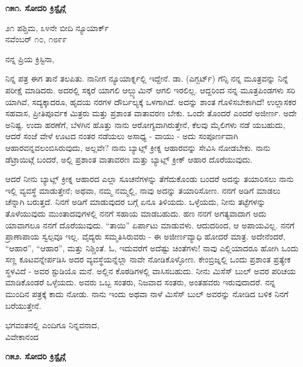 \begin{center}
\textbf{೧೫೧. ಸೋದರಿ ಕ್ರಿಸ್ಟೈನ್ಗೆ}
\end{center}

\begin{flushright}
೨೧ ಪಶ್ಚಿಮ, ೩೪ನೇ ಬೀದಿ ನ್ಯೂಯಾರ್ಕ್\\ನವೆಂಬರ್ ೧೦, ೧೮೯೯
\end{flushright}

ನನ್ನ ಪ್ರಿಯ ಕ್ರಿಸ್ಟಿನಾ,

ನಿನ್ನ ಪತ್ರ ಈಗ ತಾನೆ ತಲಪಿತು. ನಾನೀಗ ನ್ಯೂಯಾರ್ಕ್ನಲ್ಲಿ ಇದ್ದೇನೆ. ಡಾ. (ಎಗ್ಬರ್ಟ್) ಗೆನ್ಸಿ ನನ್ನ ಮೂತ್ರವನ್ನು ನಿನ್ನೆ ಪರೀಕ್ಷೆ ಮಾಡಿದರು. ಅದರಲ್ಲಿ ಸಕ್ಕರೆ ಯಾಗಲಿ ಆಲ್ಬ್ಯುಮಿನ್ ಆಗಲಿ ಇರಲಿಲ್ಲ. ಆದ್ದರಿಂದ ನನ್ನ ಮೂತ್ರಪಿಂಡಗಳು ಸರಿ ಯಾಗಿವೆ, ಸದ್ಯಕ್ಕಾದರೂ, ಹೃದಯ ನರಗಳ ದೌರ್ಬಲ್ಯಕ್ಕೆ ಒಳಗಾಗಿದೆ. ಅದನ್ನು ಶಾಂತ ಗೊಳಿಸಬೇಕಾಗಿದೆ! ಉಲ್ಲಾಸಕರ ಸಹವಾಸ, ಪ್ರೀತಿಪೂರ್ವಕ ಮಿತ್ರರು ಮತ್ತು ಪ್ರಶಾಂತ ವಾತಾವರಣ ಬೇಕು. ಒಂದೇ ತೊಂದರೆ ಎಂದರೆ ಅಜೀರ್ಣ. ಅದೇ ಅನಿಷ್ಟ. ಉದಾ ಹರಣೆಗೆ, ಬೆಳಗಿನ ಹೊತ್ತು ನಾನು ಆರೋಗ್ಯವಾಗಿರುತ್ತೇನೆ, ಕೆಲವು ಮೈಲಿಗಳು ನಡೆ ಯಬಹುದು, ಆದರೆ ಸಂಜೆ ವೇಳೆ ಊಟದ ನಂತರ ನಡೆಯಲು ಅಸಾಧ್ಯ - ವಾಯು - ಅದು ಸಂಪೂರ್ಣವಾಗಿ ಆಹಾರವನ್ನವಲಂಬಿಸಿರುವುದು, ಅಲ್ಲವೇ? ನಾನು ಬ್ಯಾಟ್ಲ್ ಕ್ರೀಕ್ನ ಆಹಾರವನ್ನು ಸೇವಿಸಿ ನೋಡಬೇಕು. ನಾನು ಡೆಟ್ರಾಯಿಟ್ಗೆ ಬಂದರೆ, ಅಲ್ಲಿ ಪ್ರಶಾಂತ ವಾತಾವರಣ ಮತ್ತು ಬ್ಯಾಟ್ಲ್ ಕ್ರೀಕ್ ಆಹಾರ ದೊರೆಯುವುದು.

ಆದರೆ ನೀನು ಬ್ಯಾಟ್ಲ್ ಕ್ರೀಕ್ನ ಆಹಾರದ ಎಲ್ಲಾ ಸೂಚನೆಗಳನ್ನು ತೆಗೆದುಕೊಂಡು ಬಂದರೆ ಅದನ್ನು ತಯಾರಿಸಲು ನಾನು ಇಲ್ಲಿ ವ್ಯವಸ್ಥೆ ಮಾಡುತ್ತೇನೆ; ಅಥವಾ, ನಮ್ಮ ನಮ್ಮಲ್ಲಿ, ನಾವು ಅದನ್ನು ತಯಾರಿಸೋಣ. ನನಗೆ ಅಡಿಗೆ ಮಾಡಲು ಚೆನ್ನಾಗಿ ಬರುತ್ತದೆ. ನಿನಗೆ ಅಡಿಗೆ ಮಾಡುವುದರ ಬಗ್ಗೆ ಏನೂ ತಿಳಿಯದು. ಒಳ್ಳೆಯದು, ನೀನು ತಟ್ಟೆಗಳನ್ನು ತೊಳೆಯುವುದು ಮುಂತಾದವುಗಳಲ್ಲಿ ನನಗೆ ಸಹಾಯ ಮಾಡಬಹುದು. ಹಣ ನನಗೆ ಅಗತ್ಯವಾದಾಗ ಅದು ಯಾವಾಗಲೂ ನನಗೆ ದೊರೆಯುವುದು. “ತಾಯಿ” ಏರ್ಪಾಟು ಮಾಡುವಳು. ಆದುದರಿಂದ, ಆ ಅಪಾಯವಿಲ್ಲ. ನನಗೆ ಪ್ರಾಣಾಪಾಯ ಸ್ವಲ್ಪವೂ ಇಲ್ಲ. ವೈದ್ಯರು ಸಮ್ಮತಿಸಿರುವರು - ಈ ಅಜೀರ್ಣವ್ಯಾಧಿ ಹೋದರೆ ಮಾತ್ರ. ಅದೇನೆಂದರೆ, “ಆಹಾರ”, “ಆಹಾರ”, ಮತ್ತು ನಿಶ್ಚಿಂತೆ. ಓ, ಇದುವರೆಗೆ ಅದೆಷ್ಟು ಚಿಂತೆಗಳು! ನಾವು ಎಲ್ಲಿಯಾದರೂ ಹೋಗಿ ಒಂದು ಸಣ್ಣ ಕೂಟವನ್ನೇರ್ಪಡಿಸಿ ಅದರ ವ್ಯವಸ್ಥೆಯನ್ನೆಲ್ಲಾ ನಾವೇ ನೋಡಿಕೊಳ್ಳೋಣ. ಕೇಂಬ್ರಿಜ್ನಲ್ಲಿ ಒಂದು ಪ್ರಶಾಂತ ಪ್ರತ್ಯೇಕ ಸ್ಥಳವಿದೆ - ಅವರ ಸ್ಟುಡಿಯೊ ಮನೆ. ಅಲ್ಲಿನ ಕೊಠಡಿಗಳಲ್ಲಿ ವಾಸಿಸಬಹುದು. ನೀನು ಮಿಸೆಸ್ ಬುಲ್ ಅವರ ಪರಿಚಯ ಮಾಡಿಕೊಂಡರೆ ಒಳ್ಳೆಯದು. ಅವರು ಒಬ್ಬ ಸಂತರು, ನಿಜವಾದ ಸಂತರು, ಅಂತಹವರು ಇರುವುದಾದರೆ. ನನ್ನ ಮುಂದಿನ ಪತ್ರಕ್ಕೆ ಕಾದು ನೋಡು. ನಾನು ಇಂದು ಅಥವಾ ನಾಳೆ ಮಿಸೆಸ್ ಬುಲ್ ಅವರನ್ನು ನೋಡಿದ ಬಳಿಕ ನಿನಗೆ ಬರೆಯುತ್ತೇನೆ.

\begin{flushright}
ಭಗವಂತನಲ್ಲಿ ಎಂದಿಗೂ ನಿನ್ನವನಾದ,\\ವಿವೇಕಾನಂದ
\end{flushright}

\begin{center}
\textbf{೧೫೨. ಸೋದರಿ ಕ್ರಿಸ್ಟೈನ್ಗೆ}
\end{center}

